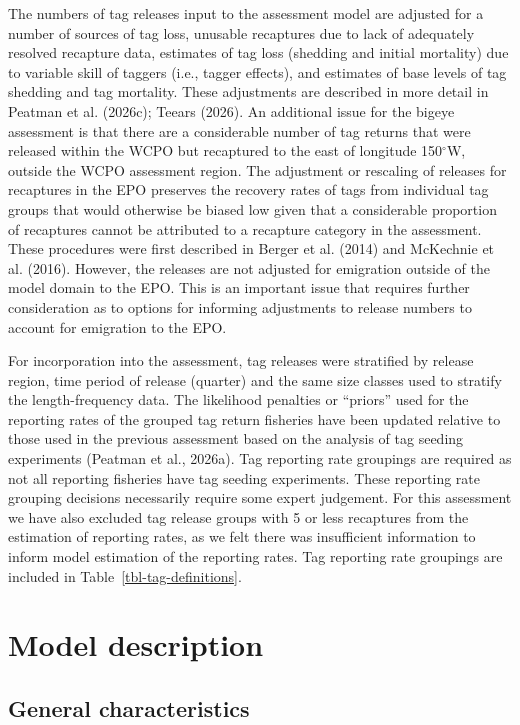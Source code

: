 \documentclass[
  english,
  a4paper,
  a4paper,
  11pt]{SCreport}
\begin{document}
The numbers of tag releases input to the assessment model are adjusted
for a number of sources of tag loss, unusable recaptures due to lack of
adequately resolved recapture data, estimates of tag loss (shedding and
initial mortality) due to variable skill of taggers (i.e., tagger
effects), and estimates of base levels of tag shedding and tag
mortality. These adjustments are described in more detail in Peatman et
al. (2026c); Teears (2026). An additional issue for the bigeye
assessment is that there are a considerable number of tag returns that
were released within the WCPO but recaptured to the east of longitude
150\(^\circ\)W, outside the WCPO assessment region. The adjustment or
rescaling of releases for recaptures in the EPO preserves the recovery
rates of tags from individual tag groups that would otherwise be biased
low given that a considerable proportion of recaptures cannot be
attributed to a recapture category in the assessment. These procedures
were first described in Berger et al. (2014) and McKechnie et al.
(2016). However, the releases are not adjusted for emigration outside of
the model domain to the EPO. This is an important issue that requires
further consideration as to options for informing adjustments to release
numbers to account for emigration to the EPO.

For incorporation into the assessment, tag releases were stratified by
release region, time period of release (quarter) and the same size
classes used to stratify the length-frequency data. The likelihood
penalties or ``priors'' used for the reporting rates of the grouped tag
return fisheries have been updated relative to those used in the
previous assessment based on the analysis of tag seeding experiments
(Peatman et al., 2026a). Tag reporting rate groupings are required as
not all reporting fisheries have tag seeding experiments. These
reporting rate grouping decisions necessarily require some expert
judgement. For this assessment we have also excluded tag release groups
with 5 or less recaptures from the estimation of reporting rates, as we
felt there was insufficient information to inform model estimation of
the reporting rates. Tag reporting rate groupings are included in
Table~\ref{tbl-tag-definitions}.

\section{Model description}\label{sec-model-description}

\subsection{General characteristics}\label{general-characteristics-1}
\end{document}
